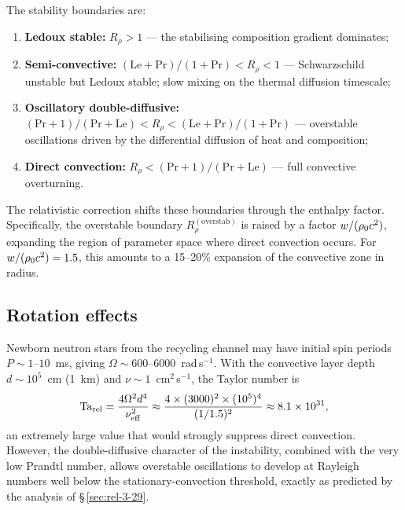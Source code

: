 The stability boundaries are:
\begin{enumerate}
  \item \textbf{Ledoux stable:} $R_{\rho} > 1$ --- the stabilising
    composition gradient dominates;
  \item \textbf{Semi-convective:} $(\mathrm{Le}+\mathrm{Pr})/
    (1+\mathrm{Pr}) < R_{\rho} < 1$ --- Schwarzschild unstable but
    Ledoux stable; slow mixing on the thermal diffusion timescale;
  \item \textbf{Oscillatory double-diffusive:}
    $(\mathrm{Pr}+1)/(\mathrm{Pr}+\mathrm{Le}) < R_{\rho} <
    (\mathrm{Le}+\mathrm{Pr})/(1+\mathrm{Pr})$ --- overstable
    oscillations driven by the differential diffusion of heat
    and composition;
  \item \textbf{Direct convection:} $R_{\rho} <
    (\mathrm{Pr}+1)/(\mathrm{Pr}+\mathrm{Le})$ --- full
    convective overturning.
\end{enumerate}

The relativistic correction shifts these boundaries through the
enthalpy factor.  Specifically, the overstable boundary
$R_{\rho}^{(\mathrm{overstab})}$ is raised by a factor
$w/(\rho_0 c^{2})$, expanding the region of parameter
space where direct convection occurs.  For $w/(\rho_0 c^{2})
= 1.5$, this amounts to a 15--20\% expansion of the convective zone
in radius.

\subsection{Rotation effects}

Newborn neutron stars from the recycling channel may have initial spin
periods $P \sim 1$--$10$~ms, giving $\Omega \sim 600$--$6000$~rad\,s$^{-1}$.
With the convective layer depth $d \sim 10^{5}$~cm (1~km) and
$\nu \sim 1$~cm$^{2}$\,s$^{-1}$, the Taylor number is
\begin{equation}\label{eq:rel-3-app-Ta-PNS}
  \mathrm{Ta}_{\mathrm{rel}}
  = \frac{4\Omega^{2}d^{4}}{\nu_{\mathrm{eff}}^{2}}
  \approx \frac{4 \times (3000)^{2} \times (10^{5})^{4}}
         {(1/1.5)^{2}}
  \approx 8.1 \times 10^{31},
\end{equation}
an extremely large value that would strongly suppress direct convection.
However, the double-diffusive character of the instability, combined
with the very low Prandtl number, allows overstable oscillations to
develop at Rayleigh numbers well below the stationary-convection
threshold, exactly as predicted by the analysis of
\S\,\ref{sec:rel-3-29}.

